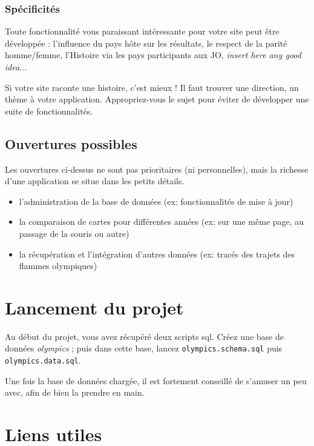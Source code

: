 \documentclass{article}
\begin{document}
\subsubsection{Spécificités}

Toute fonctionnalité vous paraissant intéressante pour votre site peut être développée : l'influence du pays hôte sur les résultats, le respect de la parité homme/femme, l'Histoire via les pays participants aux JO, \textit{insert here any good idea}...

Si votre site raconte une histoire, c'est mieux ! Il faut trouver une direction, un thème à votre application. Appropriez-vous le sujet pour éviter de développer une suite de fonctionnalités.

\subsection{Ouvertures possibles}

Les ouvertures ci-dessus ne sont pas prioritaires (ni personnelles), mais la richesse d'une application se situe dans les petits détails.

\begin{itemize}

\item l'administration de la base de données (ex: fonctionnalités de mise à jour)

\item la comparaison de cartes pour différentes années (ex: sur une même page, au passage de la souris ou autre)

\item la récupération et l'intégration d'autres données (ex: tracés des trajets des flammes olympiques)

\end{itemize}

\section{Lancement du projet}

Au début du projet, vous avez récupéré deux scripts sql. Créez une base de données \textit{olympics} ; puis dans cette base, lancez \texttt{olympics.schema.sql} puis \texttt{olympics.data.sql}.

Une fois la base de données chargée, il est fortement conseillé de s'amuser un peu avec, afin de bien la prendre en main.

\section{Liens utiles}
\end{document}
